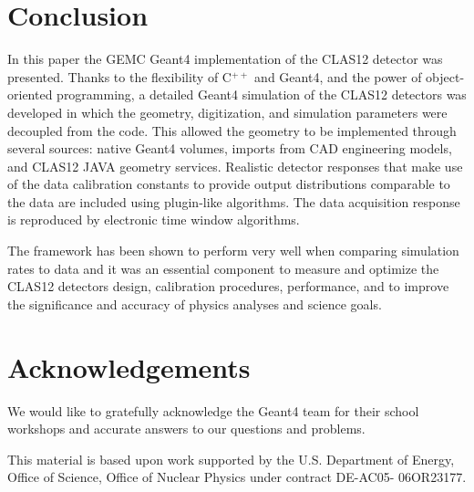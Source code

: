 \section{Conclusion}
In this paper the GEMC Geant4 implementation of the CLAS12 detector was presented.
Thanks to the flexibility of C$^{++}$ and Geant4, and the power of object-oriented programming,
a detailed Geant4 simulation of the CLAS12 detectors was developed in which the geometry,
digitization, and simulation parameters were decoupled from the code.
This allowed the geometry to be implemented through several sources: native Geant4 volumes, imports from CAD engineering models,
and CLAS12 JAVA geometry services. Realistic detector responses that
make use of the data calibration constants to provide output distributions comparable to the data are included
using plugin-like algorithms. The data acquisition response is reproduced by electronic time window algorithms.

The framework has been shown to perform very well when comparing simulation rates to data
and it was an essential component to measure and optimize the CLAS12 detectors design, calibration procedures, performance,
and to improve the significance and accuracy of physics analyses and science goals.

\section{Acknowledgements}

We would like to gratefully acknowledge the Geant4 team
for their school workshops and accurate answers to our questions and problems.

This material is based upon work supported by the U.S. Department of Energy,
Office of Science, Office of Nuclear Physics under contract DE-AC05- 06OR23177.

